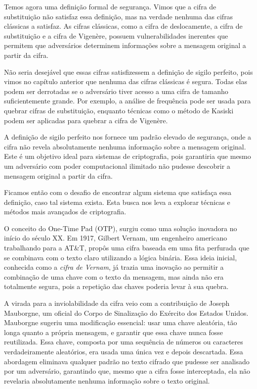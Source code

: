 Temos agora uma definição formal de segurança.
Vimos que a cifra de substituição não satisfaz essa definição, mas na verdade nenhuma das cifras clássicas a satisfaz.
As cifras clássicas, como a cifra de deslocamente, a cifra de substituição e a cifra de Vigenère, possuem vulnerabilidades inerentes que permitem que adversários determinem informações sobre a mensagem original a partir da cifra.

Não seria desejável que essas cifras satisfizessem a definição de sigilo perfeito, pois vimos no capítulo anterior que nenhuma das cifras clássicas é segura.
Todas elas podem ser derrotadas se o adversário tiver acesso a uma cifra de tamanho suficientemente grande.
Por exemplo, a análise de frequência pode ser usada para quebrar cifras de substituição, enquanto técnicas como o método de Kasiski podem ser aplicadas para quebrar a cifra de Vigenère.

A definição de sigilo perfeito nos fornece um padrão elevado de segurança, onde a cifra não revela absolutamente nenhuma informação sobre a mensagem original.
Este é um objetivo ideal para sistemas de criptografia, pois garantiria que mesmo um adversário com poder computacional ilimitado não pudesse descobrir a mensagem original a partir da cifra.

Ficamos então com o desafio de encontrar algum sistema que satisfaça essa definição, caso tal sistema exista.
Esta busca nos leva a explorar técnicas e métodos mais avançados de criptografia.

O conceito do One-Time Pad (OTP), surgiu como uma solução inovadora no início do século XX.
Em 1917, Gilbert Vernam, um engenheiro americano trabalhando para a AT\&T, propôs uma cifra baseada em uma fita perfurada que se combinava com o texto claro utilizando a lógica binária.
Essa ideia inicial, conhecida como a {\em cifra de Vernam}, já trazia uma inovação ao permitir a combinação de uma chave com o texto da mensagem, mas ainda não era totalmente segura, pois a repetição das chaves poderia levar à sua quebra.

A virada para a inviolabilidade da cifra veio com a contribuição de Joseph Mauborgne, um oficial do Corpo de Sinalização do Exército dos Estados Unidos.
Mauborgne sugeriu uma modificação essencial:
usar uma chave aleatória, tão longa quanto a própria mensagem, e garantir que essa chave nunca fosse reutilizada.
Essa chave, composta por uma sequência de números ou caracteres verdadeiramente aleatórios, era usada uma única vez e depois descartada.
Essa abordagem eliminava qualquer padrão no texto cifrado que pudesse ser analisado por um adversário, garantindo que, mesmo que a cifra fosse interceptada, ela não revelaria absolutamente nenhuma informação sobre o texto original.

